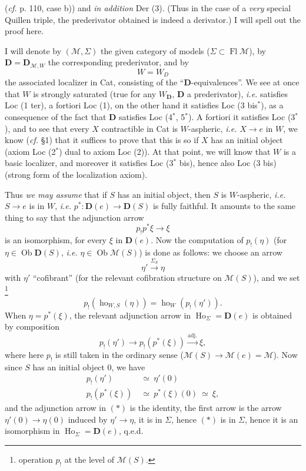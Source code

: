 (\textit{cf.} p. 110, case b)) and \textit{in addition} Der (3). (Thus in the case of a \textit{very} special Quillen triple, the prederivator obtained is indeed a derivator.) I will spell out the proof here.

I will denote by $(\mathcal{M},\Sigma)$ the given category of models ($\Sigma\subset\operatorname{Fl}\mathcal{M}$), by $\mathbf{D}=\mathbf{D}_{\mathcal{M},W}$ the corresponding prederivator, and by
\[ W=W_D \] %
the associated localizer in Cat, consisting of the ``$\mathbf{D}$-equivalences''. We see at once that $W$ is strongly saturated (true for any $W_{\mathbf{D}}$, $\mathbf{D}$ a prederivator), \textit{i.e.} satisfies Loc (1 ter), a fortiori Loc (1), on the other hand it satisfies Loc (3 bis$^*$), as a consequence of the fact that $\mathbf{D}$ satisfies Loc (4$^*$, 5$^*$). A fortiori it satisfies Loc (3$^*$), and to see that every $X$ contractible in Cat is $W$-aspheric, \textit{i.e.} $X\longrightarrow e$ in $W$, we know (\textit{cf.} §1)
that it suffices to prove that this is so if $X$ has an initial object (axiom Loc (2$^*$) dual to axiom Loc (2)). At that point, we will know that $W$ is a basic localizer, and moreover it satisfies Loc (3$^*$ bis), hence also Loc (3 bis) (strong form of the localization axiom).

Thus \textit{we may assume} that if $S$ has an initial object, then $S$ is $W$-aspheric, \textit{i.e.} $S\longrightarrow e$ is in $W$, \textit{i.e.} $p^*:\mathbf{D}(e)\longrightarrow\mathbf{D}(S)$ is fully faithful. It amounts to the same thing to say that the adjunction arrow
\[ p_!p^*\xi\longrightarrow\xi \]
is an isomorphism, for every $\xi$ in $\mathbf{D}(e)$. Now the computation of $p_!(\eta)$ (for $\eta\in\operatorname{Ob}\mathbf{D}(S)$, \textit{i.e.} $\eta\in\operatorname{Ob}\mathcal{M}(S)$) is done as follows: we choose an arrow
\[ \eta'\xrightarrow{\Sigma_S}\eta \]
with $\eta'$ ``cofibrant'' (for the relevant cofibration structure on $\mathcal{M}(S)$), and we
set \footnote[54]{operation $p_!$ at the level of $\mathcal{M}(S)$.}
\[ p_!(\operatorname{ho}_{W,S}(\eta))=\operatorname{ho}_W(p_!(\eta')). \]
When $\eta=p^*(\xi)$, the relevant adjunction arrow in $\operatorname{Ho}_\Sigma=\mathbf{D}(e)$ is obtained by composition
\[ p_!(\eta')\longrightarrow p_!(p^*(\xi))\xrightarrow{\text{adj.}}\xi, \tag*{$(*)$} \]
where here $p_!$ is still taken in the ordinary sense ($\mathcal{M}(S)\longrightarrow\mathcal{M}(e)=\mathcal{M}$). Now since $S$ has an initial object 0, we have
\[ \begin{aligned}
p_!(\eta') &\ \simeq\ \eta'(0)\\
p_!(p^*(\xi)) &\ \simeq\ p^*(\xi)(0)\ \simeq\ \xi,
\end{aligned} \]
and the adjunction arrow in $(*)$ is the identity, the first arrow is the arrow $\eta'(0)\longrightarrow\eta(0)$ induced by $\eta'\longrightarrow\eta$, it is in $\Sigma$, hence $(*)$ is in $\Sigma$, hence it is an isomorphism in $\operatorname{Ho}_\Sigma=\mathbf{D}(e)$, q.e.d.

